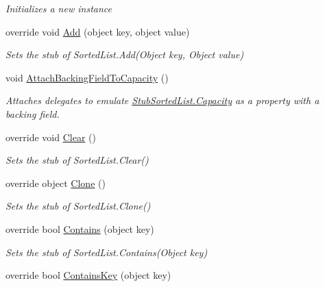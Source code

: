 \begin{DoxyCompactItemize}
\begin{DoxyCompactList}\small\item\em Initializes a new instance\end{DoxyCompactList}\item 
override void \hyperlink{class_system_1_1_collections_1_1_fakes_1_1_stub_sorted_list_a9073fc1a0c4bad5817ee62f8bbd88c23}{Add} (object key, object value)
\begin{DoxyCompactList}\small\item\em Sets the stub of Sorted\-List.\-Add(\-Object key, Object value)\end{DoxyCompactList}\item 
void \hyperlink{class_system_1_1_collections_1_1_fakes_1_1_stub_sorted_list_a3e944bd758cf7cd32f3d0e68a43aa153}{Attach\-Backing\-Field\-To\-Capacity} ()
\begin{DoxyCompactList}\small\item\em Attaches delegates to emulate \hyperlink{class_system_1_1_collections_1_1_fakes_1_1_stub_sorted_list_ac772f600962424fd819fcd7f7a382165}{Stub\-Sorted\-List.\-Capacity} as a property with a backing field.\end{DoxyCompactList}\item 
override void \hyperlink{class_system_1_1_collections_1_1_fakes_1_1_stub_sorted_list_a70e28bcbdd1a9b9fe669c7bfff0d8b74}{Clear} ()
\begin{DoxyCompactList}\small\item\em Sets the stub of Sorted\-List.\-Clear()\end{DoxyCompactList}\item 
override object \hyperlink{class_system_1_1_collections_1_1_fakes_1_1_stub_sorted_list_ace968b37539dfc0b34ab7bf5eb823a9d}{Clone} ()
\begin{DoxyCompactList}\small\item\em Sets the stub of Sorted\-List.\-Clone()\end{DoxyCompactList}\item 
override bool \hyperlink{class_system_1_1_collections_1_1_fakes_1_1_stub_sorted_list_ab339ea842aa512cae4657f8d54b7a770}{Contains} (object key)
\begin{DoxyCompactList}\small\item\em Sets the stub of Sorted\-List.\-Contains(\-Object key)\end{DoxyCompactList}\item 
override bool \hyperlink{class_system_1_1_collections_1_1_fakes_1_1_stub_sorted_list_a0c0d056647e90f7424907360ed4c5c54}{Contains\-Key} (object key)

\end{DoxyCompactItemize}
